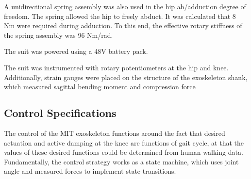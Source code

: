  A unidirectional spring assembly was also used in the hip ab/adduction degree of freedom.  The spring allowed the hip to freely abduct.  It was calculated that 8 Nm were required during adduction.  To this end, the effective rotary stiffness of the spring assembly was 96 Nm/rad.

The suit was powered using a 48V battery pack.

The suit was instrumented with rotary potentiometers at the hip and knee.  Additionally, strain gauges were placed on the structure of the exoskeleton shank, which measured sagittal bending moment and compression force 
 
 
 \subsection{Control Specifications}
 
 The control of the MIT exoskeleton functions around the fact that desired actuation and active damping at the knee are functions of gait cycle, at that the values of these desired functions could be determined from human walking data.  Fundamentally, the control strategy works as a state machine, which uses joint angle and measured forces to implement state transitions.

